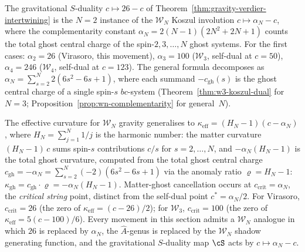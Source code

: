 \begin{remark}
\label{rem:gravity-s-duality-wn}
%
%
The gravitational $S$-duality $c \mapsto 26 - c$ of
Theorem~\ref{thm:gravity-verdier-intertwining}
is the $N = 2$ instance of the $\mathcal{W}_N$ Koszul
involution $c \mapsto \alpha_N - c$, where the complementarity
constant $\alpha_N = 2(N{-}1)(2N^2 + 2N + 1)$ counts the total
ghost central charge of the spin-$2, 3, \ldots, N$ ghost systems.
For the first cases:
$\alpha_2 = 26$ (Virasoro, this movement),
$\alpha_3 = 100$ ($\mathcal{W}_3$, self-dual at $c = 50$),
$\alpha_4 = 246$ ($\mathcal{W}_4$, self-dual at $c = 123$).
The general formula decomposes as
$\alpha_N = \sum_{s=2}^{N} 2(6s^2 - 6s + 1)$, where each
summand $-c_{\mathrm{gh}}(s)$ is the ghost central charge
of a single spin-$s$ $bc$-system
(Theorem~\ref{thm:w3-koszul-dual} for $N = 3$;
Proposition~\ref{prop:wn-complementarity} for general~$N$).

The effective curvature for $\mathcal{W}_N$ gravity generalises
to $\kappa_{\mathrm{eff}} = (H_N - 1)(c - \alpha_N)$, where
$H_N = \sum_{j=1}^N 1/j$ is the harmonic number:
the matter curvature $(H_N - 1)\,c$ sums spin-$s$ contributions
$c/s$ for $s = 2, \ldots, N$, and
$-\alpha_N(H_N - 1)$ is the total ghost curvature,
computed from the total ghost central charge
$c_{\mathrm{gh}} = -\alpha_N = \sum_{s=2}^N (-2)(6s^2{-}6s{+}1)$
via the anomaly ratio $\varrho = H_N{-}1$:
$\kappa_{\mathrm{gh}} = c_{\mathrm{gh}} \cdot \varrho
= -\alpha_N(H_N{-}1)$.
Matter-ghost cancellation occurs at
$c_{\mathrm{crit}} = \alpha_N$, the
\emph{critical string} point, distinct from the
self-dual point $c^* = \alpha_N/2$.
For Virasoro, $c_{\mathrm{crit}} = 26$
(the zero of $\kappa_{\mathrm{eff}} = (c - 26)/2$);
for $\mathcal{W}_3$, $c_{\mathrm{crit}} = 100$
(the zero of $\kappa_{\mathrm{eff}} = 5(c - 100)/6$).
Every movement in this section admits a $\mathcal{W}_N$ analogue
in which $26$ is replaced by $\alpha_N$, the
$\hat{A}$-genus is replaced by the $\mathcal{W}_N$ shadow
generating function, and the gravitational $S$-duality map
$\cS$ acts by $c \mapsto \alpha_N - c$.
\end{remark}




